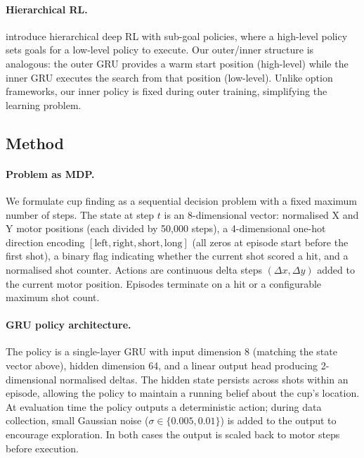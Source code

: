 \documentclass[twoside,11pt]{article}
\begin{document}
\paragraph{Hierarchical RL.}
\citet{kulkarni2016hierarchical} introduce hierarchical deep RL with sub-goal
policies, where a high-level policy sets goals for a low-level policy to
execute. Our outer/inner structure is analogous: the outer GRU provides a warm
start position (high-level) while the inner GRU executes the search from that
position (low-level). Unlike option frameworks, our inner policy is fixed
during outer training, simplifying the learning problem.

\subsection{Method}

\paragraph{Problem as MDP.}
We formulate cup finding as a sequential decision problem with a fixed maximum
number of steps. The state at step $t$ is an 8-dimensional vector: normalised X
and Y motor positions (each divided by 50{,}000 steps), a 4-dimensional one-hot
direction encoding $[\text{left}, \text{right}, \text{short}, \text{long}]$
(all zeros at episode start before the first shot), a binary flag indicating
whether the current shot scored a hit, and a normalised shot counter. Actions
are continuous delta steps $(\Delta x, \Delta y)$ added to the current motor
position. Episodes terminate on a hit or a configurable maximum shot count.

\paragraph{GRU policy architecture.}
The policy is a single-layer GRU with input dimension 8 (matching the state
vector above), hidden dimension 64, and a linear output head producing
2-dimensional normalised deltas. The hidden state persists across shots within
an episode, allowing the policy to maintain a running belief about the cup's
location. At evaluation time the policy outputs a deterministic action; during
data collection, small Gaussian noise ($\sigma \in \{0.005, 0.01\}$) is added
to the output to encourage exploration. In both cases the output is scaled back
to motor steps before execution.
\end{document}
